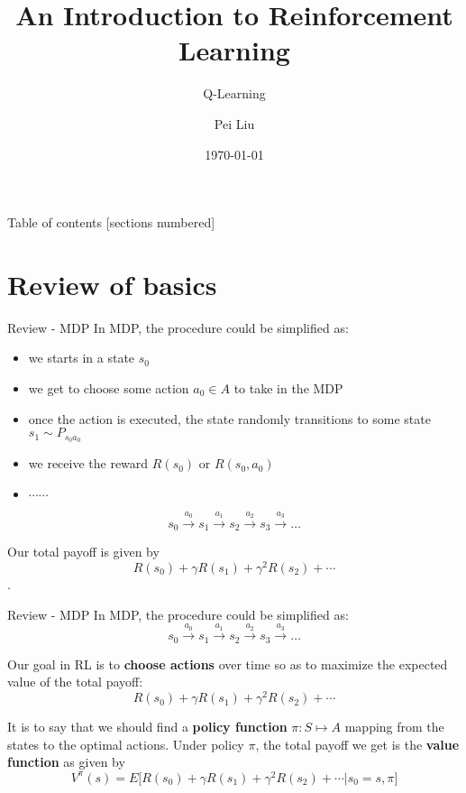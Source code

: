 \documentclass[10pt]{beamer}
\title{An Introduction to Reinforcement Learning}
\subtitle{Q-Learning}
\date{\today}
\author{Pei Liu}
\institute{Department of Computer Science @UESTC}
\begin{document}
\maketitle

\begin{frame}{Table of contents}
  [sections numbered]
  \tableofcontents[hideallsubsections]
\end{frame}

\section{Review of basics}

\begin{frame}{Review - MDP}
  In MDP, the procedure could be simplified as:
  \begin{itemize}
    \item we starts in a state $s_0$
    \item we get to choose some action $a_0\in A$ to take in the MDP
    \item once the action is executed, the state randomly transitions to some state $s_1\sim P_{s_0 a_0}$
    \item we receive the reward $R(s_0)$ or $R(s_0, a_0)$
    \item $\cdots \cdots$
  \end{itemize}

  $$s_0 \overset{a_0}{\longrightarrow} s_1 \overset{a_1}{\longrightarrow} s_2 \overset{a_2}{\longrightarrow} s_3 \overset{a_3}{\longrightarrow} \dots$$

  Our total payoff is given by $$R(s_0) + \gamma R(s_1) + \gamma^2 R(s_2) + \cdots$$. 

\end{frame}

\begin{frame}{Review - MDP}
  In MDP, the procedure could be simplified as: $$s_0 \overset{a_0}{\longrightarrow} s_1 \overset{a_1}{\longrightarrow} s_2 \overset{a_2}{\longrightarrow} s_3 \overset{a_3}{\longrightarrow} \dots$$

  Our goal in RL is to \textbf{choose actions} over time so as to \alert{maximize the expected value} of the total payoff: $$R(s_0) + \gamma R(s_1) + \gamma^2 R(s_2) + \cdots$$

  It is to say that we should find a \textbf{policy function} $\pi : S\mapsto A$ mapping from the states to the optimal actions. Under policy $\pi$, the total payoff we get is the \textbf{value function} as given by $$V^{\pi}(s)=E\bigl[R(s_0) + \gamma R(s_1) + \gamma^2 R(s_2) + \cdots|s_0=s, \pi\bigr]$$

\end{frame}
\end{document}
